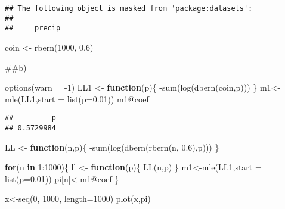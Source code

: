 \documentclass[
]{article}
\newenvironment{Shaded}{\begin{snugshade}}{\end{snugshade}}
\newcommand{\AttributeTok}[1]{\textcolor[rgb]{0.77,0.63,0.00}{#1}}
\newcommand{\ControlFlowTok}[1]{\textcolor[rgb]{0.13,0.29,0.53}{\textbf{#1}}}
\newcommand{\DecValTok}[1]{\textcolor[rgb]{0.00,0.00,0.81}{#1}}
\newcommand{\FloatTok}[1]{\textcolor[rgb]{0.00,0.00,0.81}{#1}}
\newcommand{\FunctionTok}[1]{\textcolor[rgb]{0.00,0.00,0.00}{#1}}
\newcommand{\NormalTok}[1]{#1}
\newcommand{\OtherTok}[1]{\textcolor[rgb]{0.56,0.35,0.01}{#1}}
\newcommand{\SpecialCharTok}[1]{\textcolor[rgb]{0.00,0.00,0.00}{#1}}
\begin{document}
\begin{verbatim}
## The following object is masked from 'package:datasets':
## 
##     precip
\end{verbatim}

\begin{Shaded}
\begin{Highlighting}[]
\NormalTok{coin }\OtherTok{\textless{}{-}} \FunctionTok{rbern}\NormalTok{(}\DecValTok{1000}\NormalTok{, }\FloatTok{0.6}\NormalTok{)}
\end{Highlighting}
\end{Shaded}

\#\#b)

\begin{Shaded}
\begin{Highlighting}[]
\FunctionTok{options}\NormalTok{(}\AttributeTok{warn =} \SpecialCharTok{{-}}\DecValTok{1}\NormalTok{)}
\NormalTok{LL1 }\OtherTok{\textless{}{-}} \ControlFlowTok{function}\NormalTok{(p)\{}
  \SpecialCharTok{{-}}\FunctionTok{sum}\NormalTok{(}\FunctionTok{log}\NormalTok{(}\FunctionTok{dbern}\NormalTok{(coin,p)))}
\NormalTok{\}}
\NormalTok{m1}\OtherTok{\textless{}{-}}\FunctionTok{mle}\NormalTok{(LL1,}\AttributeTok{start =} \FunctionTok{list}\NormalTok{(}\AttributeTok{p=}\FloatTok{0.01}\NormalTok{))}
\NormalTok{m1}\SpecialCharTok{@}\NormalTok{coef}
\end{Highlighting}
\end{Shaded}

\begin{verbatim}
##         p 
## 0.5729984
\end{verbatim}

\begin{Shaded}
\begin{Highlighting}[]
\NormalTok{LL }\OtherTok{\textless{}{-}} \ControlFlowTok{function}\NormalTok{(n,p)\{}
  \SpecialCharTok{{-}}\FunctionTok{sum}\NormalTok{(}\FunctionTok{log}\NormalTok{(}\FunctionTok{dbern}\NormalTok{(}\FunctionTok{rbern}\NormalTok{(n, }\FloatTok{0.6}\NormalTok{),p)))}
\NormalTok{\}}

\ControlFlowTok{for}\NormalTok{(n }\ControlFlowTok{in} \DecValTok{1}\SpecialCharTok{:}\DecValTok{1000}\NormalTok{)\{}
\NormalTok{  ll }\OtherTok{\textless{}{-}} \ControlFlowTok{function}\NormalTok{(p)\{}
    \FunctionTok{LL}\NormalTok{(n,p)}
\NormalTok{  \}}
\NormalTok{  m1}\OtherTok{\textless{}{-}}\FunctionTok{mle}\NormalTok{(LL1,}\AttributeTok{start =} \FunctionTok{list}\NormalTok{(}\AttributeTok{p=}\FloatTok{0.01}\NormalTok{))}
\NormalTok{  pi[n]}\OtherTok{\textless{}{-}}\NormalTok{m1}\SpecialCharTok{@}\NormalTok{coef}
\NormalTok{\}}

\NormalTok{x}\OtherTok{\textless{}{-}}\FunctionTok{seq}\NormalTok{(}\DecValTok{0}\NormalTok{, }\DecValTok{1000}\NormalTok{, }\AttributeTok{length=}\DecValTok{1000}\NormalTok{)}
\FunctionTok{plot}\NormalTok{(x,pi)}
\end{Highlighting}
\end{Shaded}
\end{document}
